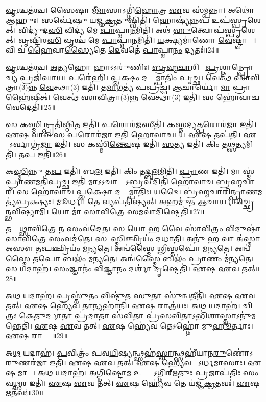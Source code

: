    \ul{𑌵𑍃}𑌶𑍍𑌚𑌤॑𑌶𑍍𑌚।
   𑌸𑍈𑌷𑌾 𑌮𑍀॑\ul{𑌮𑌾}\ul{}𑌸𑌾𑌽𑌗𑍍𑌨𑌿॑\ul{𑌹𑍋}𑌤𑍍𑌰 \ul{𑌏}𑌵 𑌸॑𑌮𑍍𑌪𑌨𑍍𑌨𑌾।
   𑌅𑌥𑍋॑ 𑌆𑌹𑍁𑌃।
   𑌸𑌰𑍍𑌵𑍇॑𑌷𑍁 𑌯𑌜𑍍𑌞\ul{𑌕𑍍𑌰}𑌤𑍁𑌷𑍍𑌵𑌿𑌤𑌿॑।
   𑌹𑍋𑌷𑍍𑌯॑\ul{𑌨𑍍𑌨}𑌪 𑌉𑌪॑𑌸𑍍𑌪𑍃𑌶𑍇𑌤𑍍।
   𑌵𑌿𑌦𑍍𑌯𑍁॑𑌦\ul{𑌸𑌿} 𑌵𑌿𑌦𑍍𑌯॑ 𑌮𑍇 \ul{𑌪𑌾}𑌪𑍍𑌮𑌾\ul{𑌨}𑌮𑌿𑌤𑌿॑।
   𑌅𑌥॑ \ul{𑌹𑍁}𑌤𑍍𑌵𑍋𑌪॑𑌸𑍍𑌪𑍃𑌶𑍇𑌤𑍍।
   𑌵𑍃𑌷𑍍𑌟𑌿॑𑌰\ul{𑌸𑌿} 𑌵𑍃𑌶𑍍𑌚॑ 𑌮𑍇 \ul{𑌪𑌾}𑌪𑍍𑌮𑌾\ul{𑌨}𑌮𑌿𑌤𑌿॑।
   \ul{𑌯}𑌕𑍍𑌷𑍍𑌯𑌮𑌾॑𑌣𑍋 \ul{𑌵𑍇}𑌷𑍍𑌟𑍍𑌵𑌾 𑌵𑌾᳚।
   𑌵𑌿 𑌚॑ \ul{𑌹𑍈}𑌵𑌾\ul{𑌸𑍍𑌯𑍈}𑌤𑍇 \ul{𑌦𑍇}𑌵𑌤𑍇॑ \ul{𑌪𑌾}𑌪𑍍𑌮𑌾\ul{𑌨𑌂} 𑌦𑍍𑌯𑌤𑌃॑॥24॥

   \ul{𑌵𑍃}𑌶𑍍𑌚𑌤॑𑌶𑍍𑌚।
   \ul{𑌅}\ul{𑌤𑍍𑌯}\ul{}𑌹𑍋 𑌹𑌾𑌽𑌽𑌰𑍁॑𑌣𑌿𑌃।
   \ul{𑌬𑍍𑌰}\ul{𑌹𑍍𑌮}\ul{𑌚𑌾}𑌰𑌿𑌣𑍇᳚ \ul{𑌪𑍍𑌰}𑌶𑍍𑌨𑌾𑌨𑍍𑌪𑍍𑌰𑍋\ul{𑌚𑍍𑌯} 𑌪𑍍𑌰𑌜𑌿॑𑌘𑌾𑌯।
   𑌪𑌰𑍇॑𑌹𑌿।
   \ul{𑌪𑍍𑌲}𑌕𑍍𑌷𑌂 𑌦𑌯𑍍𑌯𑌾᳚𑌮𑍍𑌪𑌾𑌤𑌿𑌂 𑌪𑍃𑌚𑍍𑌛।
   𑌵𑍇𑌤𑍍𑌥॑ 𑌸𑌾\ul{𑌵𑌿}𑌤𑍍𑌰𑌾(3)𑌨𑍍𑌨 \ul{𑌵𑍇}𑌤𑍍𑌥𑌾(3) 𑌇𑌤𑌿॑।
   𑌤\ul{𑌮𑌾}𑌗𑌤𑍍𑌯॑ 𑌪𑌪𑍍𑌰𑌚𑍍𑌛।
   \ul{𑌆}𑌚𑌾𑌰𑍍𑌯𑍋॑ \ul{𑌮𑌾} 𑌪𑍍𑌰𑌾𑌹𑍈॑𑌷𑍀𑌤𑍍।
   𑌵𑍇𑌤𑍍𑌥॑ 𑌸𑌾\ul{𑌵𑌿}𑌤𑍍𑌰𑌾(3)𑌨𑍍𑌨 \ul{𑌵𑍇}𑌤𑍍𑌥𑌾(3) 𑌇𑌤𑌿॑।
   𑌸 𑌹𑍋॑𑌵𑌾\ul{𑌚} 𑌵𑍇𑌦𑍇𑌤𑌿॑॥25॥

   𑌸 𑌕\ul{𑌸𑍍𑌮𑌿}𑌨𑍍𑌪𑍍𑌰𑌤𑌿॑𑌷𑍍𑌠𑌿\ul{𑌤} 𑌇𑌤𑌿॑।
   \ul{𑌪}𑌰𑍋𑌰॑\ul{𑌜}𑌸𑍀𑌤𑌿॑।
   𑌕𑌸𑍍𑌤𑌦𑍍𑌯\ul{𑌤𑍍𑌪}𑌰𑍋𑌰॑\ul{𑌜𑌾} 𑌇𑌤𑌿॑।
   \ul{𑌏}𑌷 𑌵𑌾𑌵 𑌸 \ul{𑌪}𑌰𑍋𑌰॑\ul{𑌜𑌾} 𑌇𑌤𑌿॑ 𑌹𑍋𑌵𑌾𑌚।
   𑌯 \ul{𑌏}𑌷 𑌤𑌪॑𑌤𑌿।
   \ul{𑌏}𑌷𑍋᳚𑌽𑌰𑍍𑌵𑌾𑌗𑍍𑌰॑\ul{𑌜𑌾} 𑌇𑌤𑌿॑।
   𑌸 𑌕𑌸𑍍𑌮𑌿॑\ul{𑌨𑍍𑌤𑍍𑌵𑍇}𑌷 𑌇𑌤𑌿॑।
   \ul{𑌸}𑌤𑍍𑌯 𑌇𑌤𑌿॑।
   𑌕𑌿𑌂 𑌤\ul{𑌥𑍍𑌸}𑌤𑍍𑌯𑌮𑌿𑌤𑌿॑।
   𑌤\ul{𑌪} 𑌇𑌤𑌿॑॥26॥

   𑌕\ul{𑌸𑍍𑌮𑌿}𑌨𑍍𑌨𑍁 𑌤\ul{𑌪} 𑌇𑌤𑌿॑।
   𑌬\ul{𑌲} 𑌇𑌤𑌿॑।
   𑌕𑌿𑌂 𑌤𑌦𑍍𑌬\ul{𑌲}𑌮𑌿𑌤𑌿॑।
   \ul{𑌪𑍍𑌰𑌾}𑌣 𑌇𑌤𑌿॑।
   𑌮𑌾 𑌸𑍍𑌮॑ \ul{𑌪𑍍𑌰𑌾}𑌣𑌮𑌤𑌿॑𑌪𑍃\ul{𑌚𑍍𑌛} 𑌇𑌤𑌿॑ 𑌮𑌾𑌽𑌽\ul{𑌚𑌾}𑌰𑍍𑌯𑍋᳚𑌽𑌬𑍍𑌰\ul{𑌵𑍀}𑌦𑌿𑌤𑌿॑ 𑌹𑍋𑌵𑌾𑌚 𑌬𑍍𑌰𑌹𑍍𑌮\ul{𑌚𑌾}𑌰𑍀।
   𑌸 𑌹𑍋॑𑌵𑌾𑌚 \ul{𑌪𑍍𑌲}𑌕𑍍𑌷𑍋 𑌦𑌯𑍍𑌯𑌾᳚𑌮𑍍𑌪𑌾𑌤𑌿𑌃।
   𑌯𑌦𑍍𑌵𑍈 𑌬𑍍𑌰॑𑌹𑍍𑌮𑌚𑌾𑌰𑌿\ul{𑌨𑍍𑌪𑍍𑌰𑌾}𑌣𑌮𑌤𑍍𑌯॑𑌪𑍍𑌰𑌕𑍍𑌷𑍍𑌯𑌃।
   \ul{𑌮𑍂}𑌰𑍍𑌧𑌾 \ul{𑌤𑍇} 𑌵𑍍𑌯𑌪॑𑌤𑌿𑌷𑍍𑌯𑌤𑍍।
   \ul{𑌅}𑌹𑌮𑍁॑𑌤 𑌆\ul{𑌚𑌾}𑌰𑍍𑌯𑌾𑌚𑍍𑌛𑍍𑌰𑍇𑌯𑌾᳚𑌨𑍍𑌭𑌵𑌿𑌷𑍍𑌯𑌾𑌮𑌿।
   𑌯𑍋 𑌮𑌾॑ 𑌸𑌾\ul{𑌵𑌿}𑌤𑍍𑌰𑍇 \ul{𑌸}𑌮𑌵𑌾॑\ul{𑌦𑌿}𑌷𑍍𑌟𑍇𑌤𑌿॑॥27॥

   𑌤𑌸𑍍𑌮𑌾᳚𑌥𑍍𑌸𑌾\ul{𑌵𑌿}𑌤𑍍𑌰𑍇 𑌨 𑌸𑌂𑌵॑𑌦𑍇𑌤।
   𑌸 𑌯𑍋 \ul{𑌹} 𑌵𑍈 𑌸𑌾॑\ul{𑌵𑌿}𑌤𑍍𑌰𑌂 \ul{𑌵𑌿}𑌦𑍁𑌷𑌾॑ 𑌸𑌾\ul{𑌵𑌿}𑌤𑍍𑌰𑍇 \ul{𑌸𑌂}𑌵𑌦॑𑌤𑍇।
   𑌸𑌹𑌾᳚\ul{𑌸𑍍𑌮𑌿}𑌞𑍍𑌛𑍍𑌰𑌿𑌯𑌂॑ 𑌦𑌧𑌾𑌤𑌿।
   𑌅𑌨𑍁॑ \ul{𑌹} 𑌵𑌾 𑌅॑𑌸𑍍𑌮𑌾 \ul{𑌅}𑌸𑍗 𑌤\ul{𑌪}𑌞𑍍𑌛𑍍𑌰𑌿𑌯𑌂॑ 𑌮𑌨𑍍𑌯𑌤𑍇।
   𑌅𑌨𑍍𑌵॑\ul{𑌸𑍍𑌮𑍈} 𑌶𑍍𑌰𑍀𑌸𑍍𑌤𑌪𑍋॑ 𑌮𑌨𑍍𑌯𑌤𑍇।
   𑌅𑌨𑍍𑌵॑\ul{𑌸𑍍𑌮𑍈} 𑌤\ul{𑌪𑍋} 𑌬𑌲𑌂॑ 𑌮𑌨𑍍𑌯𑌤𑍇।
   𑌅𑌨𑍍𑌵॑\ul{𑌸𑍍𑌮𑍈} 𑌬𑌲𑌂॑ \ul{𑌪𑍍𑌰𑌾}𑌣𑌂 𑌮॑𑌨𑍍𑌯𑌤𑍇।
   𑌸 𑌯𑌦𑌾𑌹॑।
   \ul{𑌸𑌂}𑌜𑍍𑌞𑌾𑌨𑌂॑ \ul{𑌵𑌿}𑌜𑍍𑌞𑌾\ul{𑌨𑌂} 𑌦𑌰𑍍\mbox{}𑌶𑌾॑ \ul{𑌦𑍃}𑌷𑍍𑌟𑍇𑌤𑌿॑।
   \ul{𑌏}𑌷 \ul{𑌏}𑌵 𑌤𑌤𑍍॥28॥

   𑌅\ul{𑌥} 𑌯𑌦𑌾𑌹॑।
   𑌪𑍍𑌰𑌸𑍍𑌤𑍁॑\ul{𑌤𑌂} 𑌵𑌿𑌷𑍍𑌟𑍁॑𑌤 \ul{𑌸𑍁}𑌤𑌾 𑌸𑍁॑\ul{𑌨𑍍𑌵}𑌤𑍀𑌤𑌿॑।
   \ul{𑌏}𑌷 \ul{𑌏}𑌵 𑌤𑌤𑍍।
   \ul{𑌏}𑌷 𑌹𑍍𑌯𑍇॑𑌵 𑌤𑌾𑌨𑍍𑌯𑌹𑌾॑𑌨𑌿।
   \ul{𑌏}𑌷 𑌰𑌾𑌤𑍍𑌰॑𑌯𑌃।
   𑌅\ul{𑌥} 𑌯𑌦𑌾𑌹॑।
   \ul{𑌚𑌿}𑌤𑍍𑌰𑌃 \ul{𑌕𑍇}𑌤𑍁\ul{𑌰𑍍𑌦𑌾}𑌤𑌾 𑌪𑍍𑌰॑\ul{𑌦𑌾}𑌤𑌾 𑌸॑\ul{𑌵𑌿}𑌤𑌾 𑌪𑍍𑌰॑𑌸\ul{𑌵𑌿}𑌤𑌾𑌽𑌭𑌿॑\ul{𑌶𑌾}𑌸𑍍𑌤𑌾𑌽𑌨𑍁॑\ul{𑌮}𑌨𑍍𑌤𑍇𑌤𑌿॑।
   \ul{𑌏}𑌷 \ul{𑌏}𑌵 𑌤𑌤𑍍।
   \ul{𑌏}𑌷 𑌹𑍍𑌯𑍇॑𑌵 𑌤𑍇𑌽𑌹𑍍𑌨𑍋॑ 𑌮𑍁\ul{𑌹𑍂}𑌰𑍍𑌤𑌾𑌃।
   \ul{𑌏}𑌷 𑌰𑌾𑌤𑍍𑌰𑍇𑌃᳚॥29॥

   𑌅\ul{𑌥} 𑌯𑌦𑌾𑌹॑।
   \ul{𑌪}𑌵𑌿𑌤𑍍𑌰𑌂॑ 𑌪𑌵\ul{𑌯𑌿}𑌷𑍍𑌯𑌨𑍍𑌥𑍍𑌸𑌹॑\ul{𑌸𑍍𑌵𑌾}𑌨𑍍𑌥𑍍𑌸𑌹𑍀॑𑌯𑌾𑌨\ul{𑌰𑍁}𑌣𑍋॑\-𑌽\ul{𑌰𑍁}𑌣𑌰॑\ul{𑌜𑌾} 𑌇𑌤𑌿॑।
   \ul{𑌏}𑌷 \ul{𑌏}𑌵 𑌤𑌤𑍍।
   \ul{𑌏}𑌷 𑌹𑍍𑌯𑍇॑𑌵 𑌤𑍇᳚𑌽𑌰𑍍𑌧\ul{𑌮𑌾}𑌸𑌾𑌃।
   \ul{𑌏}𑌷 𑌮𑌾𑌸𑌾𑌃᳚।
   𑌅\ul{𑌥} 𑌯𑌦𑌾𑌹॑।
   \ul{𑌅}\ul{𑌗𑍍𑌨𑌿}\ul{𑌷𑍍𑌟𑍋}𑌮 \ul{𑌉}𑌕𑍍𑌥𑍍𑌯𑍋᳚𑌽𑌗𑍍𑌨𑌿𑌰𑍍{‌}\ul{𑌋}𑌤𑍁𑌃 \ul{𑌪𑍍𑌰}𑌜𑌾𑌪॑𑌤𑌿𑌃 𑌸𑌂𑌵\ul{𑌥𑍍𑌸}𑌰 𑌇𑌤𑌿॑।
   \ul{𑌏}𑌷 \ul{𑌏}𑌵 𑌤𑌤𑍍।
   \ul{𑌏}𑌷 𑌹𑍍𑌯𑍇॑𑌵 𑌤𑍇 𑌯॑𑌜𑍍𑌞\ul{𑌕𑍍𑌰}𑌤𑌵𑌃॑।
   \ul{𑌏}𑌷 \ul{𑌋}𑌤𑌵𑌃॑॥30॥

